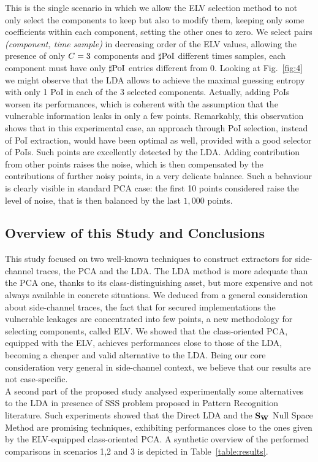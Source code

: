 This is the single scenario in which we allow the ELV selection method to not only select the components to keep but also to modify them, keeping only some coefficients within each component, setting the other ones to zero. We select pairs \textit{(component, time sample)} in decreasing order of the ELV values, allowing the presence of only $C = 3$ components and $\sharp\mathrm{PoI}$ different times samples, \ie each component must have only $\sharp\mathrm{PoI}$ entries different from 0.
Looking at Fig.~\ref{fig:4} we might observe that the LDA allows to achieve the maximal guessing entropy with only 1 PoI in each of the 3 selected components.  Actually, adding PoIs worsen its performances, which is coherent with the assumption that the vulnerable information leaks in only a few points. Remarkably, this observation shows that in this experimental case, an approach through PoI selection, instead of PoI extraction, would have been optimal as well, provided with a good selector of PoIs. Such points are excellently detected by the LDA. Adding contribution from other points raises the noise, which is then compensated by the contributions of further noisy points, in a very delicate balance. Such a behaviour is clearly visible in standard PCA case: the first 10 points considered raise the level of noise, that is then balanced by the last $1,000$ points.


\subsection{Overview of this Study and Conclusions}


This study focused on two well-known techniques to construct extractors for side-channel traces, the PCA and the LDA. The LDA method is more adequate than the PCA one, thanks to its class-distinguishing asset, but more expensive and not always available in concrete situations. We deduced from a general consideration about side-channel traces, \ie the fact that for secured implementations the vulnerable leakages are concentrated into few points, a new methodology  for selecting components, called ELV. We showed that the class-oriented PCA, equipped with the ELV, achieves performances close to those of the LDA, becoming a cheaper and valid alternative to the LDA. Being our core consideration very general in side-channel context, we believe that our results are not case-specific.  \\
A second part of the proposed study analysed experimentally some alternatives to the LDA in presence of SSS problem proposed in Pattern Recognition literature. Such experiments showed that the Direct LDA and the $\textbf{S}_{\textbf{W}}$ Null Space Method are promising techniques, exhibiting performances close to the ones given by the ELV-equipped class-oriented PCA. A synthetic overview of the performed comparisons in scenarios 1,2 and 3 is depicted in Table~\ref{table:results}.

